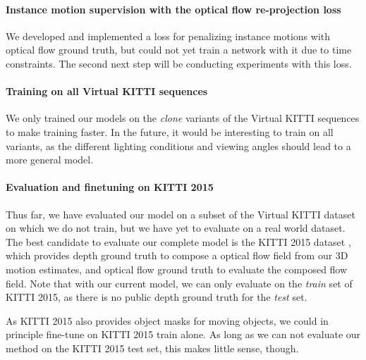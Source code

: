 \paragraph{Instance motion supervision with the optical flow re-projection loss}
We developed and implemented a loss for penalizing instance motions with optical flow ground truth,
but could not yet train a network with it due to time constraints. The second
next step will be conducting experiments with this loss.

\paragraph{Training on all Virtual KITTI sequences}
We only trained our models on the \emph{clone} variants of the Virtual KITTI sequences
to make training faster.
In the future, it would be interesting to train on all variants, as the different
lighting conditions and viewing angles should lead to a more general model.

\paragraph{Evaluation and finetuning on KITTI 2015}
Thus far, we have evaluated our model on a subset of the Virtual KITTI dataset
on which we do not train, but we have yet to evaluate on a real world dataset.
The best candidate to evaluate our complete model is the KITTI 2015 dataset \cite{KITTI2015},
which provides depth ground truth to compose a optical flow field from our 3D motion estimates,
and optical flow ground truth to evaluate the composed flow field.
Note that with our current model, we can only evaluate on the \emph{train} set
of KITTI 2015, as there is no public depth ground truth for the \emph{test} set.

As KITTI 2015 also provides object masks for moving objects, we could in principle
fine-tune on KITTI 2015 train alone. As long as we can not evaluate our method on the
KITTI 2015 test set, this makes little sense, though.

